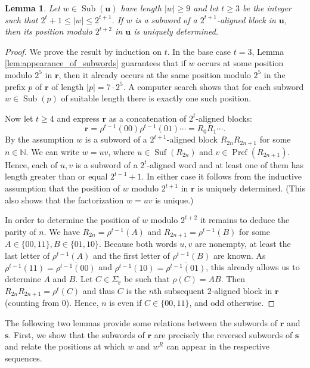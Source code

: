 \documentclass[a4paper,11pt]{amsart}
\newtheorem{lem}[thm]{Lemma}
\theoremstyle{definition}
\newcommand{\N}{\mathbb{N}}
\newcommand{\Pref}{\operatorname{Pref}}
\newcommand{\Suf}{\operatorname{Suf}}
\newcommand{\Sub}{\operatorname{Sub}}
\begin{document}
\begin{lem} \label{lem:uniquely_determined_position}
Let $w \in \Sub(\mathbf{u})$ have length $|w| \geq 9$ and let $t \geq 3$ be the integer such that $2^t+1 \leq |w| \leq 2^{t+1}$.
If $w$ is a subword of a $2^{t+1}$-aligned block in $\mathbf{u}$, then its position modulo $2^{t+2}$ in $\mathbf{u}$ is uniquely determined.
\end{lem}
\begin{proof}
We prove the result by induction on $t$. In the base case $t=3$,  Lemma \ref{lem:appearance_of_subwords} guarantees that if $w$ occurs at some position modulo $2^5$ in $\mathbf{r}$, then it already occurs at the same position modulo $2^5$ in the prefix $p$ of $\mathbf{r}$ of length $|p|=7 \cdot 2^5$. A computer search shows that for each subword $w \in \Sub(p)$ of suitable length there is exactly one such position.

Now let $t \geq 4$ and express $\mathbf{r}$ as a concatenation of $2^{t}$-aligned blocks:
$$\mathbf{r} = \rho^{t-1}(00) \rho^{t-1}(01) \cdots =  R_0 R_1 \cdots.$$
By the assumption $w$ is a subword of a $2^{t+1}$-aligned block $R_{2n} R_{2n+1}$ for some $n \in \N$. We can write $w = uv$, where $u \in \Suf(R_{2n})$ and $v \in \Pref(R_{2n+1})$. Hence, each of $u,v$ is a subword of a $2^t$-aligned word and at least one of them has length greater than or equal $2^{t-1}+1$. In either case it follows from the inductive assumption that the position of $w$ modulo $2^{t+1}$ in $\mathbf{r}$ is uniquely determined. (This also shows that the factorization $w = uv$ is unique.) 

In order to determine the position of $w$ modulo $2^{t+2}$ it remains to deduce the parity of $n$. 
We have $R_{2n} = \rho^{t-1}(A)$ and $R_{2n+1} = \rho^{t-1}(B)$  for some $A \in \{00,11\}, B \in \{01,10\}$. Because both words $u,v$ are nonempty, at least the last letter of $\rho^{t-1}(A)$ and the first letter of $\rho^{t-1}(B)$ are known. As $\rho^{t-1}(11) = \overline{\rho^{t-1}(00)}$ and $\rho^{t-1}(10) = \overline{\rho^{t-1}(01)}$, this already allows us to determine $A$ and $B$. Let $C \in \Sigma_{\mathbf{r}}$ be such that $\rho(C) = AB$. Then $R_{2n} R_{2n+1} = \rho^t(C)$ and thus $C$ is the $n$th subsequent $2$-aligned block in $\mathbf{r}$ (counting from $0$). Hence, $n$ is even if $C \in \{00,11\}$, and odd otherwise.
\end{proof}

The following two lemmas provide some relations between the subwords of $\mathbf{r}$ and $\mathbf{s}$. First, we show that the subwords of $\mathbf{r}$ are precisely the reversed subwords of $\mathbf{s}$ and relate the positions at which $w$ and $w^R$ can appear in the respective sequences.
\end{document}
